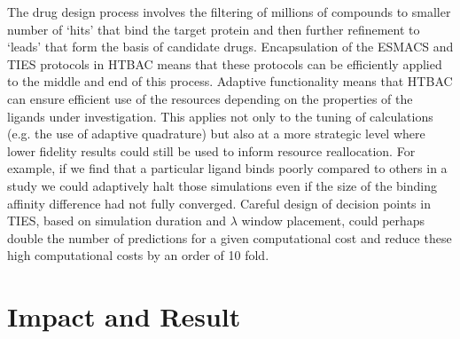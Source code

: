 \documentclass[conference]{IEEEtran}
\begin{document}

The drug design process involves the filtering of millions of compounds to  
smaller number of `hits' that bind the target protein and then further  
refinement to `leads' that form the basis of candidate drugs. Encapsulation of 
the ESMACS and TIES protocols in HTBAC means that these protocols can be 
efficiently applied to the middle and end of this process. Adaptive 
functionality means that HTBAC can ensure efficient use of the resources 
depending on the properties of the ligands under investigation. This applies 
not only to the tuning of calculations (e.g. the use of adaptive quadrature) 
but also at a more strategic level where lower fidelity results could still be 
used to inform resource reallocation. For example, if we find that a particular 
ligand binds poorly compared to others in a study we could adaptively halt those 
simulations even if the size of the binding affinity difference had not fully 
converged. Careful design of decision points in TIES, based on simulation 
duration and $\lambda$ window placement, could perhaps double the number of 
predictions for a given computational cost and reduce these high computational 
costs by an order of 10 fold. 





\section{Impact and Result}\label{sec:demo}




\end{document}
